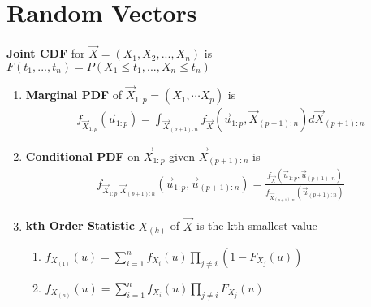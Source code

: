 \documentclass[a4paper,portrait,columns=2]{cheatsheet}
\begin{document}
\section{Random Vectors}
\textbf{Joint CDF} for \( \vec{X} = (X_1, X_2, ..., X_n)\) is \(F(t_1,...,t_n)=P(X_1 \le t_1, ..., X_n \le t_n)\)
\begin{enumerate}
	\item  \textbf{Marginal PDF} of \(\vec{X}_{1:p} = (X_{1}, \cdots X_{p})\) is 
	\begin{align*}
	f_{\vec{X}_{1:p}}\left(\vec{u}_{1:p}\right) = \int_{\vec{X}_{(p+1):n}}f_{\vec{X}}\left(\vec{u}_{1:p}, \vec{X}_{(p+1):n}\right)d\vec{X}_{(p+1):n}
	\end{align*}
	\item \textbf{Conditional PDF} on \(\vec{X}_{1:p}\) given \(\vec{X}_{(p+1):n}\) is 
	\begin{align*}
	f_{\vec{X}_{1:p} | \vec{X}_{(p+1):n}}\left(\vec{u}_{1:p}, \vec{u}_{(p+1):n}\right) =\frac{f_{\vec{X}}\left(\vec{u}_{1:p}, \vec{u}_{(p+1):n}\right)}{f_{\vec{X}_{(p+1):n}}\left(\vec{u}_{(p+1):n}\right)}
	\end{align*}
	\item \textbf{kth Order Statistic} \( X_{(k)}\) of \( \vec{X}\) is the kth smallest value
	\begin{enumerate}
		 \item \( f_{X_{(1)}}(u) = \sum_{i=1}^n f_{X_i}(u)\prod_{j \ne i}(1 - F_{X_j}(u))\)
		\item \( f_{X_{(n)}}(u)=\sum_{i=1}^n f_{X_i}(u)\prod_{j \ne i}F_{X_j}(u)\)
	\end{enumerate}
\end{enumerate}
\end{document}
